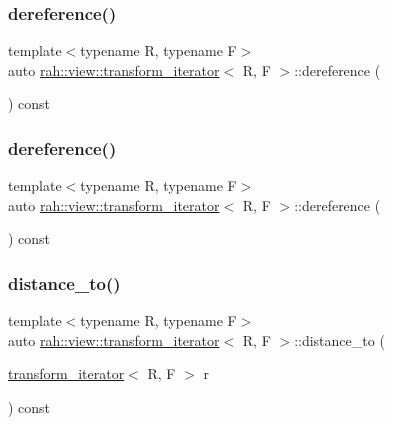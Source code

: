\subsubsection{\texorpdfstring{dereference()}{dereference()}\hspace{0.1cm}{\footnotesize\ttfamily [1/2]}}
{\footnotesize\ttfamily template$<$typename R, typename F$>$ \\
auto \mbox{\hyperlink{structrah_1_1view_1_1transform__iterator}{rah\+::view\+::transform\+\_\+iterator}}$<$ R, F $>$\+::dereference (\begin{DoxyParamCaption}{ }\end{DoxyParamCaption}) const\hspace{0.3cm}{\ttfamily [inline]}}

\mbox{\label{structrah_1_1view_1_1transform__iterator_af72f5246736a89feca39293123a999e2}} 
\subsubsection{\texorpdfstring{dereference()}{dereference()}\hspace{0.1cm}{\footnotesize\ttfamily [2/2]}}
{\footnotesize\ttfamily template$<$typename R, typename F$>$ \\
auto \mbox{\hyperlink{structrah_1_1view_1_1transform__iterator}{rah\+::view\+::transform\+\_\+iterator}}$<$ R, F $>$\+::dereference (\begin{DoxyParamCaption}{ }\end{DoxyParamCaption}) const\hspace{0.3cm}{\ttfamily [inline]}}

\mbox{\label{structrah_1_1view_1_1transform__iterator_ae0919c95985ebca42017346da790c981}} 
\subsubsection{\texorpdfstring{distance\_to()}{distance\_to()}\hspace{0.1cm}{\footnotesize\ttfamily [1/2]}}
{\footnotesize\ttfamily template$<$typename R, typename F$>$ \\
auto \mbox{\hyperlink{structrah_1_1view_1_1transform__iterator}{rah\+::view\+::transform\+\_\+iterator}}$<$ R, F $>$\+::distance\+\_\+to (\begin{DoxyParamCaption}\item[{\mbox{\hyperlink{structrah_1_1view_1_1transform__iterator}{transform\+\_\+iterator}}$<$ R, F $>$}]{r }\end{DoxyParamCaption}) const\hspace{0.3cm}{\ttfamily [inline]}}

